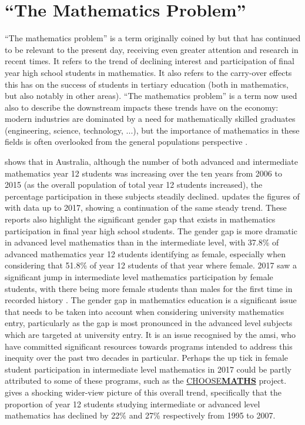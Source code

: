 \documentclass[twoside,12pt,a4paper]{report}
\begin{document}
\section{``The Mathematics Problem''}

``The mathematics problem'' is a term originally coined by  but that has continued to be relevant to the present day, receiving even greater attention and research in recent times. It refers to the trend of declining interest and participation of final year high school students in mathematics. It also refers to the carry-over effects this has on the success of students in tertiary education (both in mathematics, but also notably in other areas). ``The mathematics problem'' is a term now used also to describe the downstream impacts these trends have on the economy: modern industries  are dominated by a need for mathematically skilled graduates (engineering, science, technology, ...), but the importance of mathematics in these fields is often overlooked from the general populations perspective \cite{King2015, Gordon2013}.

 shows that in Australia, although the number of both advanced and intermediate mathematics year 12 students was increasing over the ten years from 2006 to 2015 (as the overall population of total year 12 students increased), the percentage participation in these subjects steadily declined.  updates the figures of  with data up to 2017, showing a continuation of the same steady trend. These reports also highlight the significant gender gap that exists in mathematics participation in final year high school students. The gender gap is more dramatic in advanced level mathematics than in the intermediate level, with 37.8\% of advanced mathematics year 12 students identifying as female, especially when considering that 51.8\% of year 12 students of that year where female. 2017 saw a significant jump in intermediate level mathematics participation by female students, with there being more female students than males for the first time in recorded history \cite{James2019}. The gender gap in mathematics education is a significant issue that needs to be taken into account when considering university mathematics entry, particularly as the gap is most pronounced in the advanced level subjects which are targeted at university entry. It is an issue recognised by the \gls{amsi}, who have committed significant resources towards programs intended to address this inequity over the past two decades in particular. Perhaps the up tick in female student participation in intermediate level mathematics in 2017 could be partly attributed to some of these programs, such as the \href{https://choosemaths.org.au/}{CHOOSE\textbf{MATHS}} project.  gives a shocking wider-view picture of this overall trend, specifically that the proportion of year 12 students studying intermediate or advanced level mathematics has declined by 22\% and 27\% respectively from 1995 to 2007. 
\end{document}
